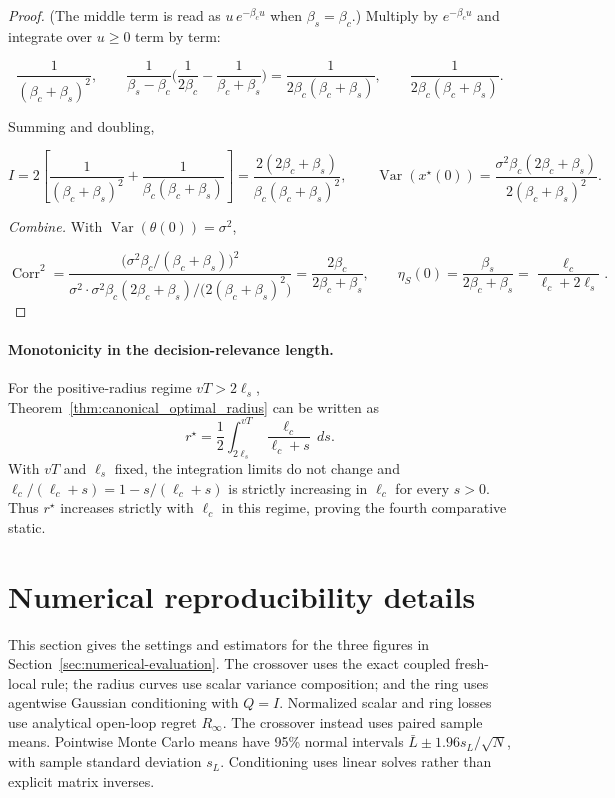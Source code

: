 \begin{proof}
(The middle term is read as $u\,e^{-\beta_c u}$ when $\beta_s=\beta_c$.) Multiply by $e^{-\beta_c u}$ and integrate over $u\ge0$ term by term:

\[
\frac{1}{(\beta_c+\beta_s)^2},\qquad \frac{1}{\beta_s-\beta_c}\Big(\frac{1}{2\beta_c}-\frac{1}{\beta_c+\beta_s}\Big)=\frac{1}{2\beta_c(\beta_c+\beta_s)},\qquad \frac{1}{2\beta_c(\beta_c+\beta_s)} .
\]

Summing and doubling,

\begin{equation}
I=2\left[\frac{1}{(\beta_c+\beta_s)^2}+\frac{1}{\beta_c(\beta_c+\beta_s)}\right]=\frac{2(2\beta_c+\beta_s)}{\beta_c(\beta_c+\beta_s)^2},\qquad \operatorname{Var}(x^\star(0))=\frac{\sigma^2\beta_c(2\beta_c+\beta_s)}{2(\beta_c+\beta_s)^2}.
\end{equation}

\emph{Combine.} With $\operatorname{Var}(\theta(0))=\sigma^2$,

\[
\operatorname{Corr}^2=\frac{\big(\sigma^2\beta_c/(\beta_c+\beta_s)\big)^2}{\sigma^2\cdot\sigma^2\beta_c(2\beta_c+\beta_s)/\big(2(\beta_c+\beta_s)^2\big)}=\frac{2\beta_c}{2\beta_c+\beta_s},\qquad \eta_S(0)=\frac{\beta_s}{2\beta_c+\beta_s}=\frac{\ell_c}{\ell_c+2\ell_s}.
\]
\end{proof}

\paragraph{Monotonicity in the decision-relevance length.}
For the positive-radius regime $vT>2\ell_s$, Theorem~\ref{thm:canonical_optimal_radius}
can be written as
\begin{equation}
r^\star=\frac12\int_{2\ell_s}^{vT}\frac{\ell_c}{\ell_c+s}\,ds.
\label{eq:rstar_integral_representation}
\end{equation}
With $vT$ and $\ell_s$ fixed, the integration limits do not change and
$\ell_c/(\ell_c+s)=1-s/(\ell_c+s)$ is strictly increasing in $\ell_c$
for every $s>0$. Thus $r^\star$ increases strictly with $\ell_c$ in this
regime, proving the fourth comparative static.

\section{Numerical reproducibility details}
\label{app:technical-numerics}
This section gives the settings and estimators for the three figures in
Section~\ref{sec:numerical-evaluation}. The crossover uses the exact coupled
fresh-local rule; the radius curves use scalar variance composition; and
the ring uses agentwise Gaussian conditioning with $Q=I$.
Normalized scalar and ring losses use analytical open-loop regret
$R_\infty$. The crossover instead uses paired sample means.
Pointwise Monte Carlo means have 95\% normal intervals
$\bar L\pm1.96s_L/\sqrt N$, with sample standard deviation $s_L$.
Conditioning uses linear solves rather than explicit matrix inverses.

